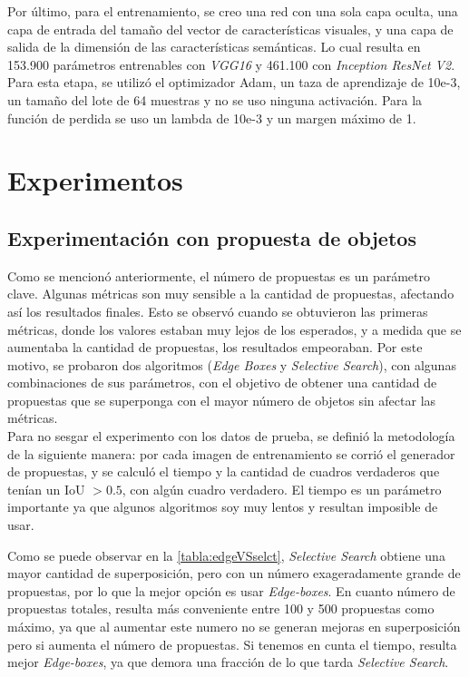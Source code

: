 Por último, para el entrenamiento, se creo una red con una sola capa oculta, una capa de entrada del tamaño del vector de características visuales, y una capa de salida de la dimensión de las características semánticas. Lo cual resulta en 153.900 parámetros entrenables con \textit{VGG16} y 461.100 con \textit{Inception ResNet V2}. Para esta etapa, se utilizó el optimizador Adam, un taza de aprendizaje de 10e-3, un tamaño del lote de 64 muestras y no se uso ninguna activación. Para la función de perdida se uso un lambda de 10e-3 y un margen máximo de 1.\\


\section{Experimentos}\label{cap:experimentos}

\subsection{Experimentación con propuesta de objetos} \label{ssec:experimentacionconpropuestadeobjetos}
Como se mencionó anteriormente, el número de propuestas es un parámetro clave. Algunas métricas son muy sensible a la cantidad de propuestas, afectando así los resultados finales. Esto se observó cuando se obtuvieron las primeras métricas, donde los valores estaban muy lejos de los esperados, y a medida que se aumentaba la cantidad de propuestas, los resultados empeoraban. Por este motivo, se probaron dos algoritmos (\textit{Edge Boxes} y \textit{Selective Search}), con algunas combinaciones de sus parámetros, con el objetivo de obtener una cantidad de propuestas que se superponga con el mayor número de objetos sin afectar las métricas.\\

Para no sesgar el experimento con los datos de prueba, se definió la metodología de la siguiente manera: por cada imagen de entrenamiento se corrió el generador de propuestas, y se calculó el tiempo y la cantidad de cuadros verdaderos que tenían un IoU $> 0.5$, con algún cuadro verdadero. El tiempo es un parámetro importante ya que algunos algoritmos soy muy lentos y resultan imposible de usar. 

Como se puede observar en la \autoref{tabla:edgeVSselct}, \textit{Selective Search} obtiene una mayor cantidad de superposición, pero con un número exageradamente grande de propuestas, por lo que la mejor opción es usar \textit{Edge-boxes}. En cuanto número de propuestas totales, resulta más conveniente entre 100 y 500 propuestas como máximo, ya que al aumentar este numero no se generan mejoras en superposición pero si aumenta el número de propuestas. Si tenemos en cunta el tiempo, resulta mejor \textit{Edge-boxes}, ya que demora una fracción de lo que tarda \textit{Selective Search}.\\

